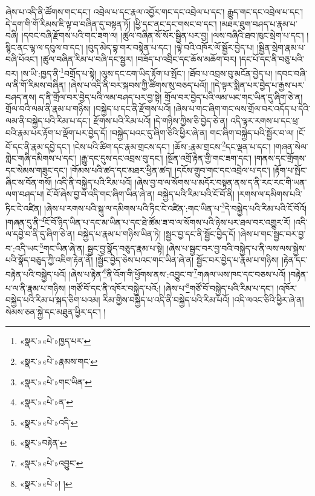 ཞེས་པ་འདི་ནི་ཚོགས་གང་དང་། འབྲེལ་པ་དང་རྣལ་འབྱོར་གང་དང་འབྲེལ་པ་དང་། རྒྱུད་གང་དང་འབྲེལ་པ་དང་། དེ་དག་གི་གོ་རིམས་ཇི་ལྟ་བ་བཞིན་དུ་བསྟན་ཏོ། །ཕྱི་དང་ནང་དང་གསང་བ་དང་། །མཐར་ཐུག་བཤད་པ་རྣམ་པ་བཞི། །དབང་བཞི་རྫོགས་པའི་གང་ཟག་ལ། །ཚུལ་བཞིན་སོ་སོར་སྦྱིན་པར་བྱ། །ལས་བཞིའི་ཐབ་ཁུང་སྲེག་པ་དང་། །སྙིང་ནང་ལྷ་ལ་དབུལ་བ་དང་། །བུད་མེད་བྷ་གར་བསྟེན་པ་དང་། །ལྟེ་བའི་འཁོར་ལོ་སྦྱོར་བྱེད་པ། །སྦྱིན་སྲེག་རྣམ་པ་བཞི་པོའང་། །ཚུལ་བཞིན་རིམ་པ་བཞི་དང་སྦྱར། །བཟོད་པ་འབྲིང་དང་ཆོས་མཆོག་བར། །དང་པོ་དང་ནི་བཅུ་པའི་བར། །ས་ཡི་:ཁྱད་ནི་\footnote{«སྣར་»«པེ་»ཁྱད་པར་}བགྲོད་པ་སྟེ། །ལུས་དང་ངག་ཡིད་རྟོག་པ་སྤོང་། །ཐོབ་པ་འབྲས་བུ་མངོན་བྱེད་པ། །དབང་བཞི་ལ་ནི་གོ་རིམས་བཞིན། །ཞེས་པ་འདི་ནི་བར་སྐབས་ཀྱི་ཚིགས་སུ་བཅད་པའོ།། །།དེ་ལྟར་སྨིན་པར་བྱེད་པ་རྒྱས་པར་བཤད་ནས། ད་ནི་གྲོལ་བར་བྱེད་པའི་ལམ་བཤད་པར་བྱ་སྟེ། གྲོལ་བར་བྱེད་པའི་ལམ་ཡང་གང་ཡིན་དུ་ཞིག་ཅེ་ན། གྲོལ་བའི་ལམ་ནི་རྣམ་པ་གཉིས། །བསྐྱེད་པ་དང་ནི་རྫོགས་པའོ། །ཞེས་པ་གང་ཞིག་གང་ལས་གྲོལ་བར་འདོད་པ་དེའི་ལམ་ནི་བསྐྱེད་པའི་རིམ་པ་དང་། རྫོགས་པའི་རིམ་པའོ། །དེ་གཉིས་ཀྱིས་ཅི་བྱེད་ཅེ་ན། འདི་ལྟར་རགས་པ་དང་ཕྲ་བའི་རྣམ་པར་རྟོག་པ་ལྡོག་པར་བྱེད་དོ། །བསྐྱེད་པའང་དུ་ཞིག་ཅིའི་ཕྱིར་ཞེ་ན། གང་ཞིག་བསྐྱེད་པའི་སྦྱོར་བ་ལ། །ངོ་བོ་དང་ནི་རྣམ་དབྱེ་དང་། །ངེས་པའི་ཚིག་དང་རྣམ་གྲངས་དང་། །ཆོས་:རྣམ་གྲངས་\footnote{«སྣར་»«པེ་»རྣམས་གང་}དང་ལྡན་པ་དང་། །གཞན་སེལ་གླེང་གཞི་དམིགས་པ་དང་། །རྒྱུ་དང་དུས་དང་འབྲས་བུ་དང་། །སྔོན་འགྲོ་རྟེན་གྱི་གང་ཟག་དང་། །གནས་དང་གྲོགས་དང་སེམས་གཟུང་དང་། །གོམས་པའི་ཚད་དང་མཐར་ཕྱིན་ཚད། །དངོས་གྲུབ་གང་དང་འབྲེལ་པ་དང་། །རྟོག་པ་སྤོང་ཞིང་ས་བོན་གསོ། །འདི་ནི་བསྐྱེད་པའི་རིམ་པའོ། །ཞེས་བྱ་བ་ལ་སོགས་པ་མདོར་བསྟན་ནས་ད་ནི་རང་རང་གི་ཡན་ལག་བཤད་པ། ངོ་བོ་ཞེས་བྱ་བ་འདི་གང་ཞིག་ཡིན་ཞེ་ན། བསྐྱེད་པའི་རིམ་པའི་ངོ་བོ་ནི། །རགས་ལ་དམིགས་པའི་ཏིང་ངེ་འཛིན། །ཞེས་པ་རགས་པའི་སྐུ་ལ་དམིགས་པའི་ཏིང་ངེ་འཛིན་:གང་ཡིན་པ་\footnote{«སྣར་»«པེ་»གང་ཡིན་}དེ་བསྐྱེད་པའི་རིམ་པའི་ངོ་བོའོ། །གཞན་དུ་ནི་\footnote{«སྣར་»«པེ་»ན་}ངོ་བོ་ཉིད་ཡིན་པ་དང་མ་ཡིན་པ་དང་ཐེ་ཚོམ་ཟ་བ་ལ་སོགས་པའི་ཉེས་པར་ཐལ་བར་འགྱུར་རོ། །འདི་ལ་དབྱེ་བ་ནི་དུ་ཞིག་ཅེ་ན། བསྐྱེད་པ་རྣམ་པ་གཉིས་ཡིན་ཏེ། །སྦྱང་བྱ་དང་ནི་སྦྱོང་བྱེད་དོ། །ཞེས་པ་གང་སྦྱང་བར་བྱ་བ་:འདི་ཡང་\footnote{«སྣར་»«པེ་»འདི་}གང་ཡིན་ཞེ་ན། སྦྱང་བྱ་སྣོད་བཅུད་རྣམ་པ་སྟེ། །ཞེས་པ་སྦྱང་བར་བྱ་བའི་བསྐྱེད་པ་ནི་ལས་ལས་སྐྱེས་པའི་སྣོད་བཅུད་ཀྱི་འཇིག་རྟེན་ནོ། །སྦྱོང་བྱེད་ཅེས་པའང་གང་ཡིན་ཞེ་ན། སྦྱོང་བར་བྱེད་པ་རྣམ་པ་གཉིས། །རྟེན་དང་བརྟེན་པའི་བསྐྱེད་པའོ། །ཞེས་པ་རྟེན་\footnote{«སྣར་»བརྟེན་}ནི་འོག་གི་ཕྱོགས་ནས་:འབྱུང་བ་\footnote{«སྣར་»«པེ་»འབྱུང་}གཞལ་ཡས་ཁང་དང་བཅས་པའོ། །བརྟེན་པ་ལ་ནི་རྣམ་པ་གཉིས། །གཙོ་བོ་དང་ནི་འཁོར་བསྐྱེད་པའོ:། །ཞེས་པ་\footnote{«སྣར་»«པེ་»། །}གཙོ་བོ་བསྐྱེད་པའི་རིམ་པ་དང་། །འཁོར་བསྐྱེད་པའི་རིམ་པ་སྐད་ཅིག་པའམ། རིམ་གྱིས་བསྐྱེད་པ་འདི་ནི་བསྐྱེད་པའི་རིམ་པའོ། །འདི་ལའང་ཅིའི་ཕྱིར་ཞེ་ན། སེམས་ཅན་སྐྱེ་དང་མཐུན་ཕྱིར་དང་། །
